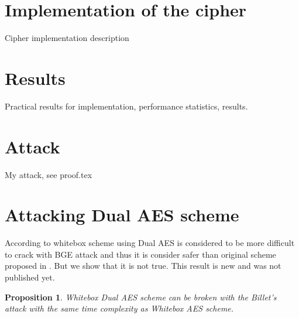 \documentclass[11pt,oneside,final]{fithesis2}
\newtheorem{myprop}{Proposition}
\begin{document}
    \section{Implementation of the cipher}
    Cipher implementation description

    \section{Results}
    Practical results for implementation, performance statistics, results.
    
    \section{Attack}
    My attack, see proof.tex

    \section{Attacking Dual AES scheme}
	According to \citep{Karroumi:2010:PWA:2041036.2041060} whitebox scheme using Dual AES is considered to be more difficult to crack with BGE attack and thus it is consider
	safer than original scheme proposed in \citep{Chow02white-boxcryptography}. But we show that it is not true. This result is new and was not published yet.
	
	\begin{myprop}
	Whitebox Dual AES scheme can be broken with the Billet's attack with the same time complexity as Whitebox AES scheme.
	\end{myprop}
\end{document}
